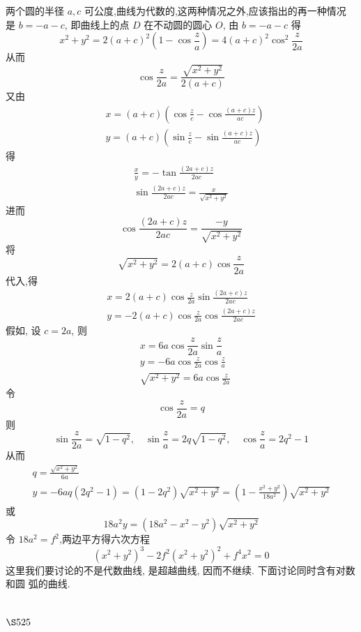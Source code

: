 两个圆的半径 $a, c$ 可公度,曲线为代数的,这两种情况之外,应该指出的再一种情况 是 $b=-a-c$, 即曲线上的点 $D$ 在不动圆的圆心 $O$, 由 $b=-a-c$ 得
\[
x^{2}+y^{2}=2(a+c)^{2}\left(1-\cos \frac{z}{a}\right)=4(a+c)^{2} \cos ^{2} \frac{z}{2 a}
\]
从而
\[
\cos \frac{z}{2 a}=\frac{\sqrt{x^{2}+y^{2}}}{2(a+c)}
\]
又由
\[
\begin{aligned}
& x=(a+c)\left(\cos \frac{z}{c}-\cos \frac{(a+c) z}{a c}\right) \\
& y=(a+c)\left(\sin \frac{z}{c}-\sin \frac{(a+c) z}{a c}\right)
\end{aligned}
\]
得
\[
\begin{gathered}
\frac{x}{y}=-\tan \frac{(2 a+c) z}{2 a c} \\
\sin \frac{(2 a+c) z}{2 a c}=\frac{x}{\sqrt{x^{2}+y^{2}}}
\end{gathered}
\]
进而
\[
\cos \frac{(2 a+c) z}{2 a c}=\frac{-y}{\sqrt{x^{2}+y^{2}}}
\]
将
\[
\sqrt{x^{2}+y^{2}}=2(a+c) \cos \frac{z}{2 a}
\]
代入,得
\[
\begin{gathered}
x=2(a+c) \cos \frac{z}{2 a} \sin \frac{(2 a+c) z}{2 a c} \\
y=-2(a+c) \cos \frac{z}{2 a} \cos \frac{(2 a+c) z}{2 a c}
\end{gathered}
\]
假如, 设 $c=2 a$, 则
\[
x=6 a \cos \frac{z}{2 a} \sin \frac{z}{a}
\]
\[
\begin{aligned}
& y=-6 a \cos \frac{z}{2 a} \cos \frac{z}{a} \\
& \sqrt{x^{2}+y^{2}}=6 a \cos \frac{z}{2 a}
\end{aligned}
\]
令
\[
\cos \frac{z}{2 a}=q
\]
则
\[
\sin \frac{z}{2 a}=\sqrt{1-q^{2}}, \quad \sin \frac{z}{a}=2 q \sqrt{1-q^{2}}, \quad \cos \frac{z}{a}=2 q^{2}-1
\]
从而
\[
\begin{gathered}
q=\frac{\sqrt{x^{2}+y^{2}}}{6 a} \\
y=-6 a q\left(2 q^{2}-1\right)=\left(1-2 q^{2}\right) \sqrt{x^{2}+y^{2}}=\left(1-\frac{x^{2}+y^{2}}{18 a^{2}}\right) \sqrt{x^{2}+y^{2}}
\end{gathered}
\]
或
\[
18 a^{2} y=\left(18 a^{2}-x^{2}-y^{2}\right) \sqrt{x^{2}+y^{2}}
\]
令 $18 a^{2}=f^{2}$,两边平方得六次方程
\[
\left(x^{2}+y^{2}\right)^{3}-2 f^{2}\left(x^{2}+y^{2}\right)^{2}+f^{4} x^{2}=0
\]
这里我们要讨论的不是代数曲线, 是超越曲线, 因而不继续. 下面讨论同时含有对数和圆 弧的曲线.

\section{$\S 525$}


